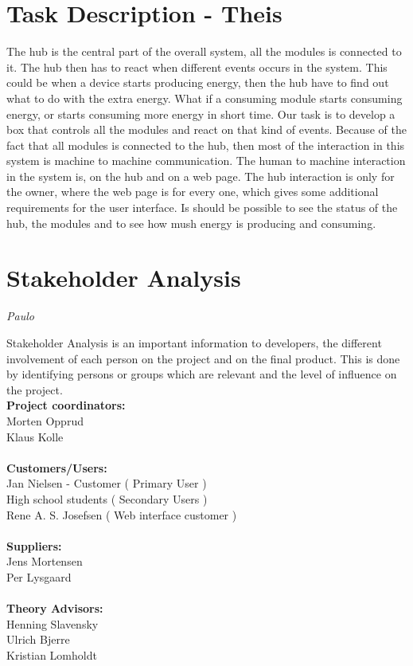 \section{Task Description - Theis}
The hub is the central part of the overall system, all the modules is connected to it. The hub then has to react when different events occurs in the system. This could be when a device starts producing energy, then the hub have to find out what to do with the extra energy. What if a consuming module starts consuming energy, or starts consuming more energy in short time. Our task is to develop a box that controls all the modules and react on that kind of events. Because of the fact that all modules is connected to the hub, then most of the interaction in this system is machine to machine communication. The human to machine interaction in the system is, on the hub and on a web page. The hub interaction is only for the owner, where the web page is for every one, which gives some additional requirements for the user interface. Is should be possible to see the status of the hub, the modules and to see how mush energy is producing and consuming.

\section{Stakeholder Analysis}
\textit{Paulo}

Stakeholder Analysis is an important information to developers, the different involvement of each person on the project and on the final product. This is done by identifying persons or groups which are relevant and the level of influence on the project.
\\[0.2cm]
\textbf{Project coordinators:}\\ Morten Opprud\\ Klaus Kolle\\
\\
\textbf{Customers/Users:}\\
Jan Nielsen - Customer ( Primary User )\\
High school students ( Secondary Users )\\
Rene A. S. Josefsen ( Web interface customer )\\
\\
\textbf{Suppliers:}\\
Jens Mortensen\\
Per Lysgaard\\
\\
\textbf{Theory Advisors:}\\
Henning Slavensky\\
Ulrich Bjerre\\
Kristian Lomholdt\\


